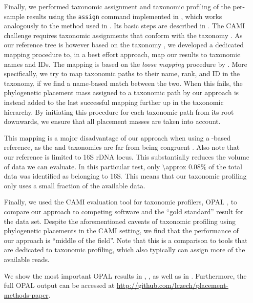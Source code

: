 Finally, we performed taxonomic assignment and taxonomic profiling of the per-sample results
using the \texttt{assign} command implemented in ,
which works analogously to the method used in  \citep{Kozlov2016}.
Its basic steps are described in .
The CAMI challenge requires taxonomic assignments
that conform with the  taxonomy \citep{Sayers2009,Benson2009}.
As our reference tree is however based on the  taxonomy \citep{Yilmaz2014},
we developed a dedicated mapping procedure to, in a best effort approach,
map our results to  taxonomic names and IDs.
The mapping is based on the \textit{loose mapping} procedure by \cite{Balvociute2017}.
More specifically, we try to map taxonomic paths to their name, rank, and ID in the  taxonomy,
if we find a name-based match between the two.
When this fails, the phylogenetic placement mass assigned to a taxonomic path by our approach
is instead added to the last successful mapping further up in the taxonomic hierarchy.
By initiating this procedure for each taxonomic path from its root downwards,
we ensure that all placement masses are taken into account.

This mapping is a major disadvantage of our approach when using a -based reference,
as the  and  taxonomies are far from being congruent \citep{Balvociute2017}.
Also note that our reference is limited to 16S rDNA locus. This substantially reduces the volume of data we can evaluate.
In this particular test, only \num{\approx 0.08}\% of the total data was identified as belonging to 16S.
This means that our taxonomic profiling only uses a small fraction of the available data.

Finally, we used the CAMI evaluation tool for taxonomic profilers, OPAL \citep{Sczyrba2017},
to compare our approach to competing software and the ``gold standard'' result for the data set.
Despite the aforementioned caveats of taxonomic profiling using phylogenetic placements in the CAMI setting,
we find that the performance of our approach is ``middle of the field''.
Note that this is a comparison to tools that are dedicated to taxonomic profiling,
which also typically can assign more of the available reads.

We show the most important OPAL results in , ,
as well as in .
Furthermore, the full OPAL output can be accessed at \url{http://github.com/lczech/placement-methods-paper}.



